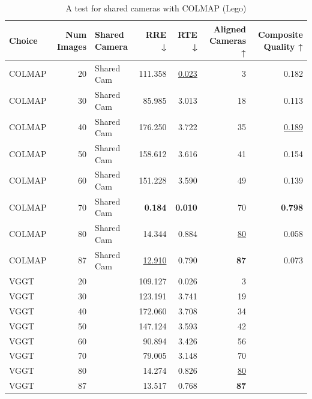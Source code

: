 \begin{table}[H]
\caption{A test for shared cameras with COLMAP (Lego)}
\label{tab:06_shared_camera_colmap_lego}
\begin{tabular}{lrlrrrr}
\toprule
Choice & Num Images & Shared Camera & RRE ↓ & RTE ↓ & Aligned Cameras ↑ & Composite Quality ↑ \\
\midrule
COLMAP & 20 & Shared Cam & 111.358 & \underline{0.023} & 3 & 0.182 \\
COLMAP & 30 & Shared Cam & 85.985 & 3.013 & 18 & 0.113 \\
COLMAP & 40 & Shared Cam & 176.250 & 3.722 & 35 & \underline{0.189} \\
COLMAP & 50 & Shared Cam & 158.612 & 3.616 & 41 & 0.154 \\
COLMAP & 60 & Shared Cam & 151.228 & 3.590 & 49 & 0.139 \\
COLMAP & 70 & Shared Cam & \textbf{0.184} & \textbf{0.010} & 70 & \textbf{0.798} \\
COLMAP & 80 & Shared Cam & 14.344 & 0.884 & \underline{80} & 0.058 \\
COLMAP & 87 & Shared Cam & \underline{12.910} & 0.790 & \textbf{87} & 0.073 \\
VGGT & 20 &  & 109.127 & 0.026 & 3 &  \\
VGGT & 30 &  & 123.191 & 3.741 & 19 &  \\
VGGT & 40 &  & 172.060 & 3.708 & 34 &  \\
VGGT & 50 &  & 147.124 & 3.593 & 42 &  \\
VGGT & 60 &  & 90.894 & 3.426 & 56 &  \\
VGGT & 70 &  & 79.005 & 3.148 & 70 &  \\
VGGT & 80 &  & 14.274 & 0.826 & \underline{80} &  \\
VGGT & 87 &  & 13.517 & 0.768 & \textbf{87} &  \\
\bottomrule
\end{tabular}
\end{table}
